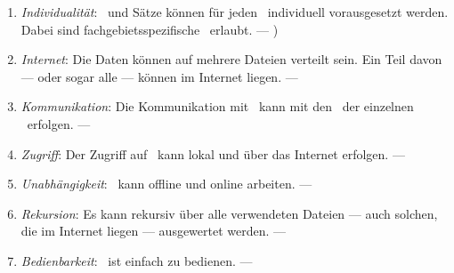 \begin{enumerate}
	\item \label{Anforderung-Individualitaet} \emph{Individualität}:
	\Axiome\ und Sätze können für jeden \Beweis\ individuell vorausgesetzt werden.
	Dabei sind fachgebietsspezifische \Fachbegriffe\ erlaubt.
	--- )

	\item \label{Anforderung-Internet} \emph{Internet}:
	Die Daten können auf mehrere Dateien verteilt sein.
	Ein Teil davon --- oder sogar alle --- können im Internet liegen.
	--- 

	\item \label{Anforderung-Kommunikation} \emph{Kommunikation}:
	Die Kommunikation mit \ASBA\ kann mit den \Fachbegriffen\ der einzelnen \Fachgebiete\ erfolgen.
	--- 

	\item \label{Anforderung-Zugriff} \emph{Zugriff}:
	Der Zugriff auf \ASBA\ kann lokal und über das Internet erfolgen.
	--- 

	\item \label{Anforderung-Unabhaengigkeit} \emph{Unabhängigkeit}:
	\ASBA\ kann offline und online arbeiten.
	--- 

	\item \label{Anforderung-Rekursion} \emph{Rekursion}:
	Es kann rekursiv über alle verwendeten Dateien --- auch solchen, die im Internet liegen --- ausgewertet werden.
	--- 

	\item \label{Anforderung-Bedienbarkeit} \emph{Bedienbarkeit}:
	\ASBA\ ist einfach zu bedienen.
	--- 

\end{enumerate}

\section[Axiome]{\Axiome}%
\beginsection   {\Axiome}
\label       {sec-Axiome}

\section[Beweise]{\Beweise}%
\beginsection    {\Beweise}
\label        {sec-Beweise}

